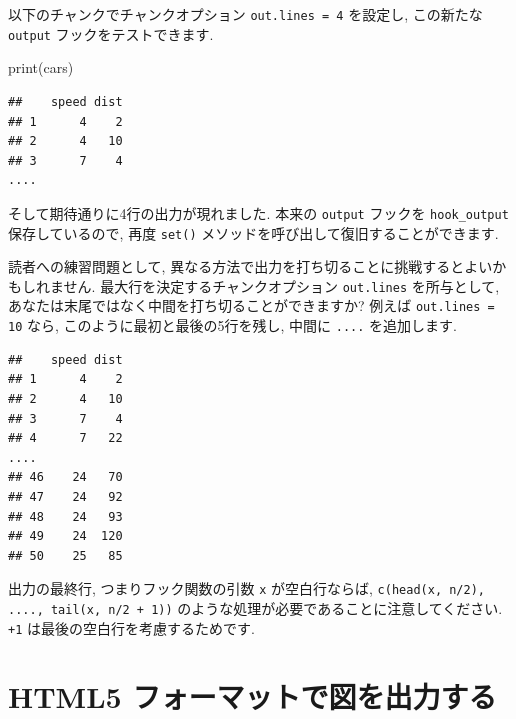 \documentclass[
  11pt,
]{bxjsreport}
\newenvironment{Shaded}{\begin{snugshade}}{\end{snugshade}}
\newcommand{\AttributeTok}[1]{\textcolor[rgb]{0.77,0.63,0.00}{#1}}
\newcommand{\FunctionTok}[1]{\textcolor[rgb]{0.00,0.00,0.00}{#1}}
\newcommand{\NormalTok}[1]{#1}
\newcommand{\SpecialCharTok}[1]{\textcolor[rgb]{0.00,0.00,0.00}{#1}}
\begin{document}
以下のチャンクでチャンクオプション \texttt{out.lines = 4} を設定し, この新たな \texttt{output} フックをテストできます.

\begin{Shaded}
\begin{Highlighting}[numbers=left,,]
\FunctionTok{print}\NormalTok{(cars)}
\end{Highlighting}
\end{Shaded}

\begin{verbatim}
##    speed dist
## 1      4    2
## 2      4   10
## 3      7    4
....
\end{verbatim}

そして期待通りに4行の出力が現れました. 本来の \texttt{output} フックを \texttt{hook\_output} 保存しているので, 再度 \texttt{set()} メソッドを呼び出して復旧することができます.

\begin{Shaded}
\end{Shaded}

読者への練習問題として, 異なる方法で出力を打ち切ることに挑戦するとよいかもしれません. 最大行を決定するチャンクオプション \texttt{out.lines} を所与として, あなたは末尾ではなく中間を打ち切ることができますか? 例えば \texttt{out.lines = 10} なら, このように最初と最後の5行を残し, 中間に \texttt{....} を追加します.

\begin{verbatim}
##    speed dist
## 1      4    2
## 2      4   10
## 3      7    4
## 4      7   22
....
## 46    24   70
## 47    24   92
## 48    24   93
## 49    24  120
## 50    25   85
\end{verbatim}

出力の最終行, つまりフック関数の引数 \texttt{x} が空白行ならば, \texttt{c(head(x, n/2), \textquotesingle{}....\textquotesingle{},\ tail(x,\ n/2\ +\ 1))} のような処理が必要であることに注意してください. \texttt{+1} は最後の空白行を考慮するためです.

\hypertarget{hook-html5}{%
\section{HTML5 フォーマットで図を出力する}\label{hook-html5}}
\end{document}
